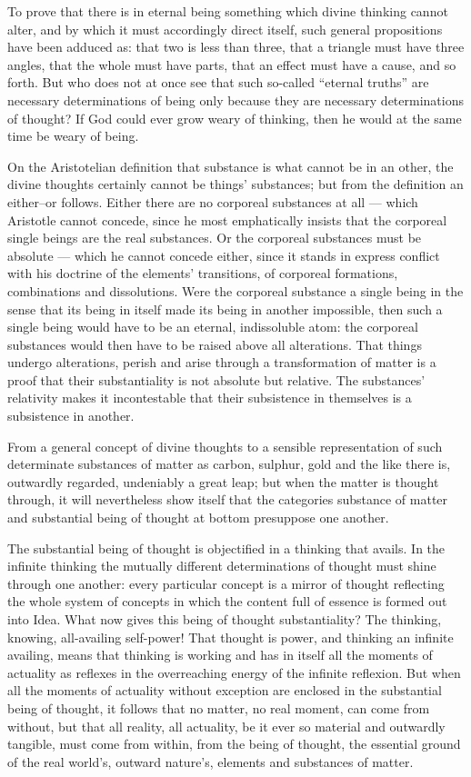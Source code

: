 \documentclass[12pt,a4paper]{book}
\begin{document}
To prove that there is in eternal being something which divine thinking cannot alter, and by which it must
accordingly direct itself, such general propositions have been adduced as: that two is less than three, that a
triangle must have three angles, that the whole must have parts, that an effect must have a cause, and so forth.
But who does not at once see that such so-called ``eternal truths'' are necessary determinations of being only
because they are necessary determinations of thought? If God could ever grow weary of thinking, then he would at
the same time be weary of being.

On the Aristotelian definition that substance is what cannot be in an other, the divine thoughts certainly cannot be
things' substances; but from the definition an either--or follows. Either there are no corporeal substances at all
--- which Aristotle cannot concede, since he most emphatically insists that the corporeal single beings are the real
substances. Or the corporeal substances must be absolute --- which he cannot concede either, since it stands in
express conflict with his doctrine of the elements' transitions, of corporeal formations, combinations and
dissolutions. Were the corporeal substance a single being in the sense that its being in itself made its being in
another impossible, then such a single being would have to be an eternal, indissoluble atom: the corporeal
substances would then have to be raised above all alterations. That things undergo alterations, perish and arise
through a transformation of matter is a proof that their substantiality is not absolute but relative. The
substances' relativity makes it incontestable that their subsistence in themselves is a subsistence in another.

From a general concept of divine thoughts to a sensible representation of such determinate substances of matter as
carbon, sulphur, gold and the like there is, outwardly regarded,
undeniably a great leap; but when the matter is thought through, it will nevertheless show itself that the
categories substance of matter and substantial being of thought at bottom presuppose one another.

The substantial being of thought is objectified in a thinking that avails. In the infinite thinking the mutually
different determinations of thought must shine through one another: every particular concept is a mirror of thought
reflecting the whole system of concepts in which the content full of essence is formed out into Idea. What now gives
this being of thought substantiality? The thinking, knowing, all-availing self-power! That thought is power, and
thinking an infinite availing, means that thinking is working and has in itself all the moments of actuality as
reflexes in the overreaching energy of the infinite reflexion. But when all the moments of actuality without
exception are enclosed in the substantial being of thought, it follows that no matter, no real moment, can come
from without, but that all reality, all actuality, be it ever so material and outwardly tangible, must come from
within, from the being of thought, the essential ground of the real world's, outward nature's, elements and
substances of matter.
\end{document}

